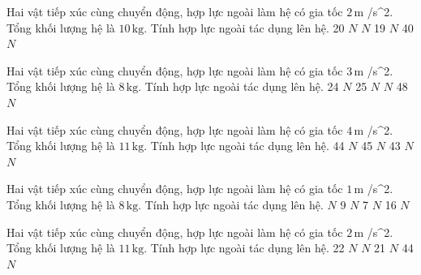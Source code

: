 \begin{ex}
Hai vật tiếp xúc cùng chuyển động, hợp lực ngoài làm hệ có gia tốc $2\,\text{m}$ /s^2. Tổng khối lượng hệ là $10\,\text{kg}$. Tính hợp lực ngoài tác dụng lên hệ.
\choice
{20 $N$}
{ $N$}
{19 $N$}
{40 $N$}
\end{ex}

\begin{ex}
Hai vật tiếp xúc cùng chuyển động, hợp lực ngoài làm hệ có gia tốc $3\,\text{m}$ /s^2. Tổng khối lượng hệ là $8\,\text{kg}$. Tính hợp lực ngoài tác dụng lên hệ.
\choice
{24 $N$}
{25 $N$}
{ $N$}
{48 $N$}
\end{ex}

\begin{ex}
Hai vật tiếp xúc cùng chuyển động, hợp lực ngoài làm hệ có gia tốc $4\,\text{m}$ /s^2. Tổng khối lượng hệ là $11\,\text{kg}$. Tính hợp lực ngoài tác dụng lên hệ.
\choice
{44 $N$}
{45 $N$}
{43 $N$}
{ $N$}
\end{ex}

\begin{ex}
Hai vật tiếp xúc cùng chuyển động, hợp lực ngoài làm hệ có gia tốc $1\,\text{m}$ /s^2. Tổng khối lượng hệ là $8\,\text{kg}$. Tính hợp lực ngoài tác dụng lên hệ.
\choice
{ $N$}
{9 $N$}
{7 $N$}
{16 $N$}
\end{ex}

\begin{ex}
Hai vật tiếp xúc cùng chuyển động, hợp lực ngoài làm hệ có gia tốc $2\,\text{m}$ /s^2. Tổng khối lượng hệ là $11\,\text{kg}$. Tính hợp lực ngoài tác dụng lên hệ.
\choice
{22 $N$}
{ $N$}
{21 $N$}
{44 $N$}
\end{ex}

